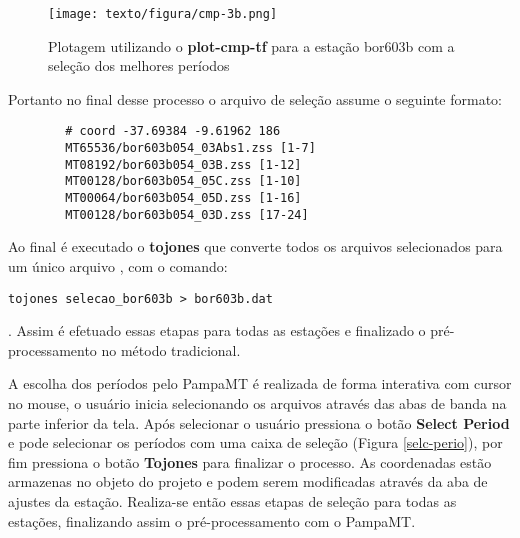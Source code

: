     \begin{figure}[H]
        \caption{Plotagem utilizando o  \textbf{plot-cmp-tf} para a estação bor603b com a seleção dos melhores períodos}
            \begin{center}
                \texttt{[image: texto/figura/cmp-3b.png]}
            \end{center}
        \legend{\Fonte{\oautor}}
        \label{plot-cmp-trad}
    \end{figure}
        
        Portanto no final desse processo o arquivo de seleção assume o seguinte formato:
        
        \begin{footnotesize}        
\begin{verbatim}
        # coord -37.69384 -9.61962 186
        MT65536/bor603b054_03Abs1.zss [1-7]
        MT08192/bor603b054_03B.zss [1-12]
        MT00128/bor603b054_05C.zss [1-10]
        MT00064/bor603b054_05D.zss [1-16]
        MT00128/bor603b054_03D.zss [17-24]
\end{verbatim}
\end{footnotesize}

        Ao final é executado o  \textbf{tojones} que converte todos os arquivos  selecionados para um único arquivo , com o comando: \begin{footnotesize}\verb|tojones selecao_bor603b > bor603b.dat|\end{footnotesize}.                                                                                                                                                                                                                      Assim é efetuado essas etapas para todas as estações e finalizado o pré-processamento no método tradicional.
        
    A escolha dos períodos pelo PampaMT é realizada de forma interativa com cursor no mouse, o usuário inicia selecionando os arquivos  através das abas de banda na parte inferior da tela. Após selecionar o usuário pressiona o botão \textbf{Select Period} e pode selecionar os períodos com uma caixa de seleção (Figura \ref{selc-perio}), por fim pressiona o botão \textbf{Tojones} para finalizar o processo. As coordenadas estão armazenas no objeto do projeto e podem serem modificadas através da aba de ajustes da estação. Realiza-se então essas etapas de seleção para todas as estações, finalizando assim o pré-processamento com o PampaMT.
    
